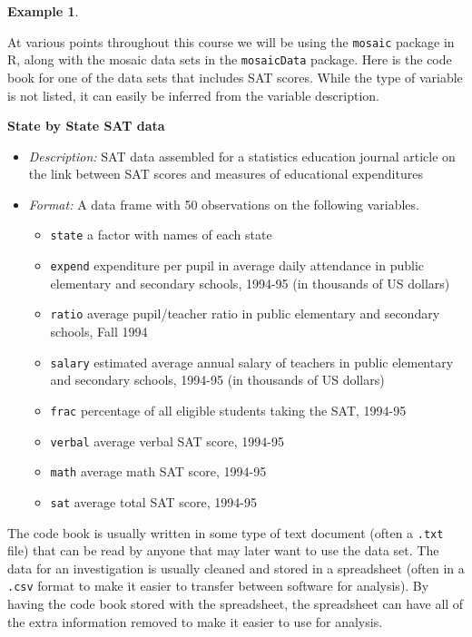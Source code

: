 \documentclass[
]{book}
\providecommand{\tightlist}{%
  \setlength{\itemsep}{0pt}\setlength{\parskip}{0pt}}
\theoremstyle{definition}
\theoremstyle{definition}
\newtheorem{example}{Example}[chapter]
\theoremstyle{definition}
\theoremstyle{definition}
\theoremstyle{remark}
\begin{document}
\begin{example}
\protect\hypertarget{exm:unlabeled-div-290}{}\label{exm:unlabeled-div-290}

At various points throughout this course we will be using the \texttt{mosaic} package in R, along with the mosaic data sets in the \texttt{mosaicData} package. Here is the code book for one of the data sets that includes SAT scores. While the type of variable is not listed, it can easily be inferred from the variable description.

\textbf{State by State SAT data}

\begin{itemize}
\item
  \emph{Description:} SAT data assembled for a statistics education journal article on the link between SAT scores and measures of educational expenditures
\item
  \emph{Format:} A data frame with 50 observations on the following variables.

  \begin{itemize}
  \tightlist
  \item
    \texttt{state} a factor with names of each state
  \item
    \texttt{expend} expenditure per pupil in average daily attendance in public elementary and secondary schools, 1994-95 (in thousands of US dollars)
  \item
    \texttt{ratio} average pupil/teacher ratio in public elementary and secondary schools, Fall 1994
  \item
    \texttt{salary} estimated average annual salary of teachers in public elementary and secondary schools, 1994-95 (in thousands of US dollars)
  \item
    \texttt{frac} percentage of all eligible students taking the SAT, 1994-95
  \item
    \texttt{verbal} average verbal SAT score, 1994-95
  \item
    \texttt{math} average math SAT score, 1994-95
  \item
    \texttt{sat} average total SAT score, 1994-95
  \end{itemize}
\end{itemize}

\end{example}

The code book is usually written in some type of text document (often a \texttt{.txt} file) that can be read by anyone that may later want to use the data set. The data for an investigation is usually cleaned and stored in a spreadsheet (often in a \texttt{.csv} format to make it easier to transfer between software for analysis). By having the code book stored with the spreadsheet, the spreadsheet can have all of the extra information removed to make it easier to use for analysis.
\end{document}
